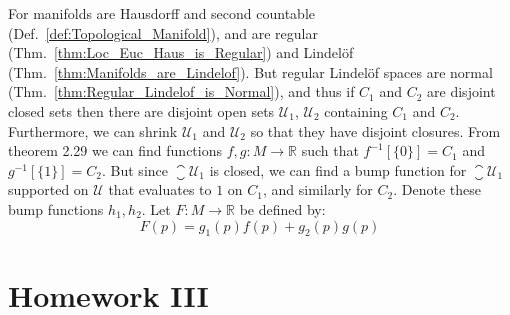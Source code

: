     \begin{solution}
        For manifolds are Hausdorff and second countable
        (Def.~\ref{def:Topological_Manifold}), and are regular
        (Thm.~\ref{thm:Loc_Euc_Haus_is_Regular}) and Lindel\"{o}f
        (Thm.~\ref{thm:Manifolds_are_Lindelof}). But regular Lindel\"{o}f
        spaces are normal (Thm.~\ref{thm:Regular_Lindelof_is_Normal}), and
        thus if $C_{1}$ and $C_{2}$ are disjoint closed sets then there are
        disjoint open sets $\mathcal{U}_{1}$, $\mathcal{U}_{2}$ containing
        $C_{1}$ and $C_{2}$. Furthermore, we can shrink $\mathcal{U}_{1}$
        and $\mathcal{U}_{2}$ so that they have disjoint closures. From
        theorem 2.29 we can find functions $f,g:M\rightarrow\mathbb{R}$ such
        that $f^{\minus{1}}[\{0\}]=C_{1}$ and $g^{\minus{1}}[\{1\}]=C_{2}$.
        But since $\closure{\mathcal{U}_{1}}$ is closed, we can find a bump
        function for $\closure{\mathcal{U}_{1}}$ supported on $\mathcal{U}$
        that evaluates to $1$ on $C_{1}$, and similarly for $C_{2}$.
        Denote these bump functions $h_{1},h_{2}$. Let
        $F:M\rightarrow\mathbb{R}$ be defined by:
        \begin{equation}
            F(p)=g_{1}(p)f(p)+g_{2}(p)g(p)
        \end{equation}
    \end{solution}
\section{Homework III}
